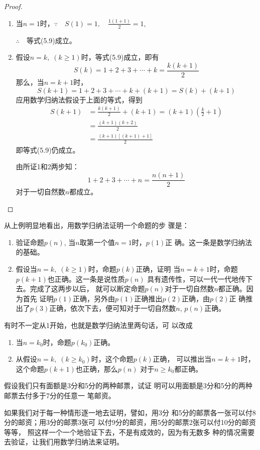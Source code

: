 \begin{proof}
    \begin{enumerate}
        \item 当$n=1$时，$\because\quad S(1)=1,\quad \frac{1(1+1)}{2}=1$,
        
        $\therefore\quad $等式(5.9)成立。

        \item 假设$n=k,\; (k\ge 1)$时，等式(5.9)成立，即有
\[S(k)=1+2+3+\cdots+k=\frac{k(k+1)}{2}\]
那么，当$n=k+1$时，
\[S(k+1)=1+2+3+\cdots+k+(k+1)=S(k)+(k+1)\]
应用数学归纳法假设于上面的等式，得到
\[\begin{split}
    S(k+1)&=\frac{k(k+1)}{2}+(k+1)=(k+1)\left(\frac{k}{2}+1\right)\\
    &=\frac{(k+1)(k+2)}{2}\\
    &=\frac{(k+1)[(k+1)+1]}{2}
\end{split}\]
即等式(5.9)仍成立。

由所证1和2两步知：
\[1+2+3+\cdots+n=\frac{n(n+1)}{2}\]
对于一切自然数$n$都成立。
\end{enumerate}
\end{proof}

从上例明显地看出，用数学归纳法证明一个命题的步
骤是：
\begin{enumerate}
\item 验证命题$p(n)$, 当$n$取第一个值$n=1$时，$p(1)$正
确。这一条是数学归纳法的基础。
\item 假设当$n=k,\; (k\ge 1)$时，命题$p(k)$正确，证明
当$n=k+1$时，命题$p(k+1)$也正确。这一条是说性质$p(n)$
具有遗传性，可以一代一代地传下去。完成了这两步以后，
就可以断定命题$p(n)$对于一切自然数$n$都正确。因为首先
证明$p(1)$正确，另外由$p(1)$正确推出$p(2)$正确，由$p(2)$正
确推出了$p(3)$正确，依次下去，便可知对于一切自然数$n$,
$p(n)$正确。
\end{enumerate}


有时不一定从1开始，也就是数学归纳法里两句话，可
以改成
\begin{enumerate}
    \item 当$n=k_0$时，命题$p(k_0)$正确。
    \item 从假设$n=k,\; (k\ge k_0)$时，这个命题$p(k)$正确，
    可以推出当$n=k+1$时，这个命题$p(k+1)$也正确，那么$p(n)$
    对于$n\ge k_0$都正确。
\end{enumerate}

\begin{example}
    假设我们只有面额是3分和5分的两种邮票，试证
明可以用面额是3分和5分的两种邮票去付多于7分的任意一
笔邮资。

如果我们对于每一种情形逐一地去证明，譬如，用3分
和5分的邮票各一张可以付8分的邮资；用3分的邮票3张可
以付9分的邮资，用5分的邮票2张可以付10分的邮资等等，
照这样一个一个地验证下去，不是有成效的，因为有无数多
种的情况需要去验证，让我们用数学归纳法来证明。
\end{example}

